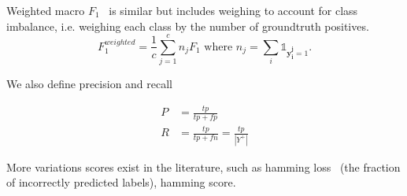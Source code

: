 
Weighted macro \(F_1\)~\cite{weightedMetrics} is similar but includes weighing to account for class imbalance, i.e. weighing each class by the number of groundtruth positives.
\begin{equation}
F_1^{weighted} = \frac{1}{c} \sum_{j=1}^c n_j F_1 \text{ where } n_j = \sum_i \mathds{1}_{\mathbf{y_i^j} = 1}.
\end{equation}


We also define precision and recall

\begin{equation}
\begin{aligned} P &=\frac{t p}{t p+f p} \\ R &=\frac{t p}{t p+f n}=\frac{t p}{\left|Y^{+}\right|} \end{aligned}
\end{equation}

More variations scores exist in the literature, such as hamming loss~\cite{hammingLoss} (the fraction of incorrectly predicted labels), hamming score.





